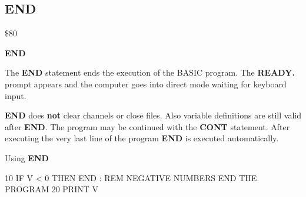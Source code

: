 \subsection{END}
\begin{description}[leftmargin=3cm,style=nextline]
\item [Token:] \$80
\item [Format:] {\bf END}
\item [Usage:] The {\bf END} statement ends the execution
               of the BASIC program. The {\bf READY.} prompt
               appears and the computer goes into direct mode
               waiting for keyboard input.

\item [Remarks:]
               {\bf END} does {\bf not} clear channels or close files.
               Also variable definitions are still valid after {\bf END}.
               The program may be continued with the {\bf CONT}
               statement. After executing the very last line of the
               program {\bf END} is executed automatically.


\item [Example:]
                Using {\bf END}
\begin{screenoutput}
10 IF V < 0 THEN END : REM NEGATIVE NUMBERS END THE PROGRAM
20 PRINT V
\end{screenoutput}
\end{description}


\newpage
